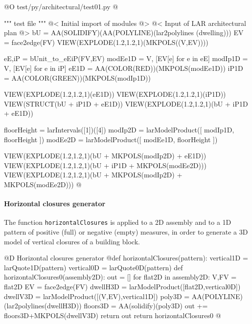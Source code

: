 \documentclass[11pt,oneside]{article}    %
\begin{document}
@O test/py/architectural/test01.py
@{""" test file """
@< Initial import of modules @>
@< Input of LAR architectural plan @>
bU = AA(SOLIDIFY)(AA(POLYLINE)(lar2polylines (dwelling)))
EV = face2edge(FV)
VIEW(EXPLODE(1.2,1.2,1)(MKPOLS((V,EV))))

eE,iP = bUnit_to_eEiP(FV,EV)
modEe1D = V, [EV[e] for e in eE]
modIp1D = V, [EV[e] for e in iP]
eE1D = AA(COLOR(RED))(MKPOLS(modEe1D))
iP1D = AA(COLOR(GREEN))(MKPOLS(modIp1D))

VIEW(EXPLODE(1.2,1.2,1)(eE1D))
VIEW(EXPLODE(1.2,1.2,1)(iP1D))
VIEW(STRUCT(bU + iP1D + eE1D))
VIEW(EXPLODE(1.2,1.2,1)(bU + iP1D + eE1D))

floorHeight = larIntervals([1])([4])
modIp2D = larModelProduct([ modIp1D, floorHeight ])
modEe2D = larModelProduct([ modEe1D, floorHeight ])

VIEW(EXPLODE(1.2,1.2,1)(bU + MKPOLS(modIp2D) + eE1D))
VIEW(EXPLODE(1.2,1.2,1)(bU + iP1D + MKPOLS(modEe2D)))
VIEW(EXPLODE(1.2,1.2,1)(bU + MKPOLS(modIp2D) + MKPOLS(modEe2D)))
@}


\paragraph{Horizontal closures generator}
The function \texttt{horizontalClosures} is applied to a 2D assembly and to a 1D pattern of positive (full) or negative (empty) measures, in order to generate a 3D model of vertical closures of a building block.

@D Horizontal closures generator
@{def horizontalClosures(pattern):
    vertical1D = larQuote1D(pattern)
    vertical0D = larQuote0D(pattern)
    def horizontalClosures0(assembly2D):
        out = []
        for flat2D in assembly2D:
            V,FV = flat2D
            EV = face2edge(FV)
            dwellH3D = larModelProduct([flat2D,vertical0D])
            dwellV3D = larModelProduct([(V,EV),vertical1D])
            poly3D = AA(POLYLINE)(lar2polylines(dwellH3D))
            floors3D = AA(solidify)(poly3D)
            out += floors3D+MKPOLS(dwellV3D)
        return out
    return horizontalClosures0
@}
\end{document}
